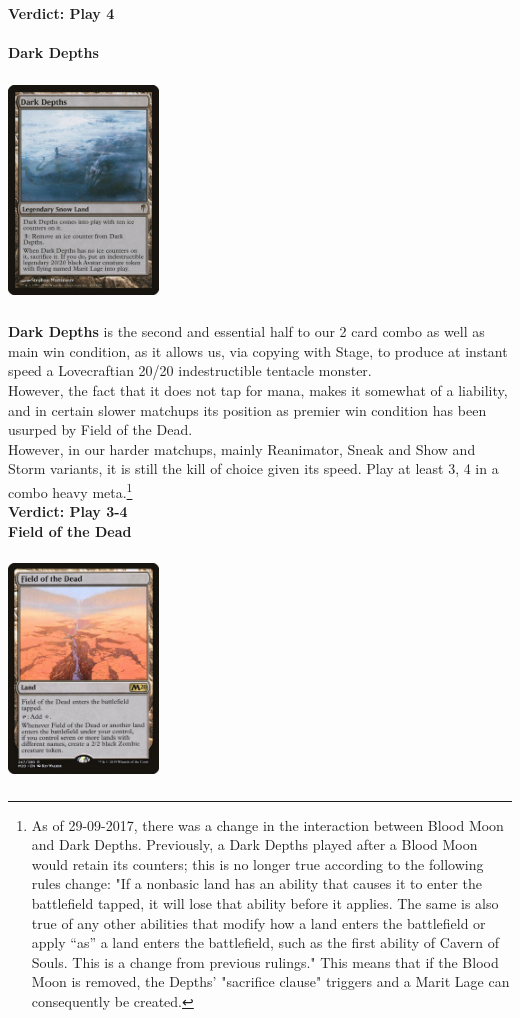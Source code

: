 \documentclass{report}
\begin{document}
\textbf{Verdict: Play 4\\\\}
\textbf{Dark Depths}
\begin{center}
\includegraphics [width = 4cm, height = 6cm] {dark-depths}
\end{center}
\textbf{Dark Depths} is the second and essential half to our 2 card combo as well as main win condition, as it allows us, via copying with Stage, to produce at instant speed a Lovecraftian 20/20 indestructible tentacle monster.\\However, the fact that it does not tap for mana, makes it somewhat of a liability, and in certain slower matchups its position as premier win condition has been usurped by Field of the Dead.\\ However, in our harder matchups, mainly Reanimator, Sneak and Show and Storm variants, it is still the kill of choice given its speed. Play at least 3, 4 in a combo heavy meta.\footnote{As of 29-09-2017, there was a change in the interaction between Blood Moon and Dark Depths. Previously, a Dark Depths played after a Blood Moon would retain its counters; this is no longer true according to the following rules change:
"If a nonbasic land has an ability that causes it to enter the battlefield tapped, it will lose that ability before it applies. The same is also true of any other abilities that modify how a land enters the battlefield or apply “as” a land enters the battlefield, such as the first ability of Cavern of Souls. This is a change from previous rulings."
This means that if the Blood Moon is removed, the Depths' "sacrifice clause" triggers and a Marit Lage can consequently be created.}
\\\textbf{Verdict: Play 3-4\\}
\newpage
\textbf{Field of the Dead}\\
\begin{center}
\includegraphics [width = 4cm, height = 6cm] {field-of-the-dead}
\end{center}
\end{document}
